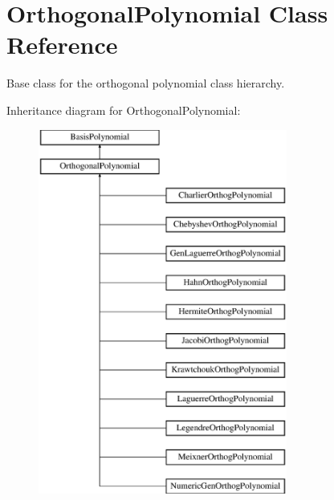 \section{Orthogonal\+Polynomial Class Reference}
\label{classPecos_1_1OrthogonalPolynomial}


Base class for the orthogonal polynomial class hierarchy.  


Inheritance diagram for Orthogonal\+Polynomial\+:\begin{figure}[H]
\begin{center}
\leavevmode
\includegraphics[height=12.000000cm]{classPecos_1_1OrthogonalPolynomial}
\end{center}
\end{figure}
